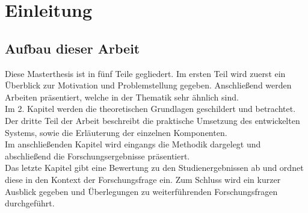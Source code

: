 \chapter{Einleitung}
\label{kap:Kapitel01}
\nocite{*} 

\section{Aufbau dieser Arbeit}
Diese Masterthesis ist in fünf Teile gegliedert. Im ersten Teil wird zuerst ein Überblick zur Motivation und Problemstellung gegeben. Anschließend werden Arbeiten präsentiert, welche in der Thematik sehr ähnlich sind. \\
Im 2. Kapitel werden die theoretischen Grundlagen geschildert und betrachtet. \\
Der dritte Teil der Arbeit beschreibt die praktische Umsetzung des entwickelten Systems, sowie die Erläuterung der einzelnen Komponenten.\\
Im anschließenden Kapitel wird eingangs die Methodik dargelegt und abschließend die Forschungsergebnisse präsentiert. \\
Das letzte Kapitel gibt eine Bewertung zu den Studienergebnissen ab und ordnet diese in den Kontext der Forschungsfrage ein. Zum Schluss wird ein kurzer Ausblick gegeben und Überlegungen zu weiterführenden Forschungsfragen durchgeführt.

